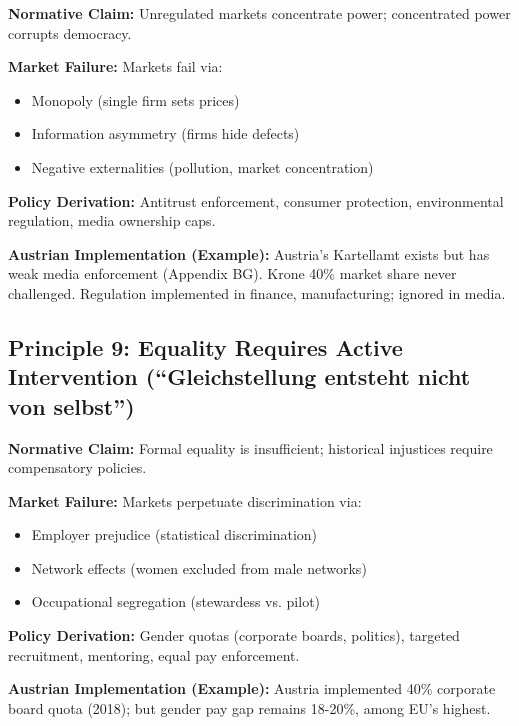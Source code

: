 \begin{tcolorbox}[colback=gray!5!white, colframe=gray!75!black,
    title=Principle BF-8: Regulatory Framework]

\textbf{Normative Claim:} Unregulated markets concentrate power; concentrated power corrupts democracy.

\textbf{Market Failure:} Markets fail via:
\begin{itemize}[nosep]
\item Monopoly (single firm sets prices)
\item Information asymmetry (firms hide defects)
\item Negative externalities (pollution, market concentration)
\end{itemize}

\textbf{Policy Derivation:} Antitrust enforcement, consumer protection, environmental regulation, media ownership caps.

\textbf{Austrian Implementation (Example):} Austria's Kartellamt exists but has weak media enforcement (Appendix BG). Krone 40\% market share never challenged. Regulation implemented in finance, manufacturing; ignored in media.

\end{tcolorbox}


\subsection{Principle 9: Equality Requires Active Intervention (``Gleichstellung entsteht nicht von selbst'')}

\begin{tcolorbox}[colback=gray!5!white, colframe=gray!75!black,
    title=Principle BF-9: Active Equity Programs]

\textbf{Normative Claim:} Formal equality is insufficient; historical injustices require compensatory policies.

\textbf{Market Failure:} Markets perpetuate discrimination via:
\begin{itemize}[nosep]
\item Employer prejudice (statistical discrimination)
\item Network effects (women excluded from male networks)
\item Occupational segregation (stewardess vs. pilot)
\end{itemize}

\textbf{Policy Derivation:} Gender quotas (corporate boards, politics), targeted recruitment, mentoring, equal pay enforcement.

\textbf{Austrian Implementation (Example):} Austria implemented 40\% corporate board quota (2018); but gender pay gap remains 18-20\%, among EU's highest.

\end{tcolorbox}

